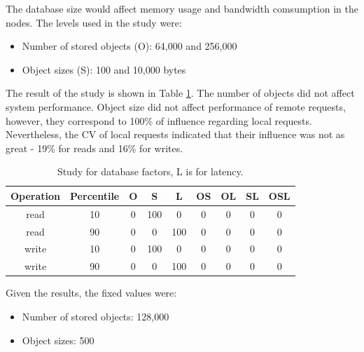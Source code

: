 \documentclass[doublespacing]{bmcart}
\begin{document}
The database size would affect memory usage and bandwidth comsumption in the
nodes. The levels used in the study were:

\begin{itemize}

\item Number of stored objects (O): 64,000 and 256,000

\item Object sizes (S): 100 and 10,000 bytes

\end{itemize}

The result of the study is shown in Table
\ref{tab:estudo_para_fatores_de_banco_de_dados}. The number of objects did not
affect system performance. Object size did not affect performance of remote
requests, however, they correspond to 100\% of influence regarding local
requests. Nevertheless, the CV of local requests indicated that their influence
was not as great - 19\% for reads and 16\% for writes.

\begin{table}[h!]
\caption{Study for database factors, L is for latency.}
\begin{tabular}{ccccccccc} \hline

Operation & Percentile & O & S & L & OS & OL & SL & OSL\\\hline

read & 10 & 0 & 100 & 0 & 0 & 0 & 0 & 0 \\

read & 90 & 0 & 0 & 100 & 0 & 0 & 0 & 0 \\

write & 10 & 0 & 100 & 0 & 0 & 0 & 0 & 0 \\

write & 90 & 0 & 0 & 100 & 0 & 0 & 0 & 0 \\\hline

\end{tabular}
\label{tab:estudo_para_fatores_de_banco_de_dados} \end{table}

Given the results, the fixed values were:

\begin{itemize}

\item Number of stored objects: 128,000

\item Object sizes: 500

\end{itemize}
\end{document}

